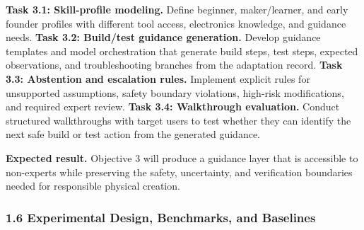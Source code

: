 \textbf{Task 3.1: Skill-profile modeling.} Define beginner, maker/learner, and early founder profiles with different tool access, electronics knowledge, and guidance needs.
\textbf{Task 3.2: Build/test guidance generation.} Develop guidance templates and model orchestration that generate build steps, test steps, expected observations, and troubleshooting branches from the adaptation record.
\textbf{Task 3.3: Abstention and escalation rules.} Implement explicit rules for unsupported assumptions, safety boundary violations, high-risk modifications, and required expert review.
\textbf{Task 3.4: Walkthrough evaluation.} Conduct structured walkthroughs with target users to test whether they can identify the next safe build or test action from the generated guidance.

\textbf{Expected result.} Objective 3 will produce a guidance layer that is accessible to non-experts while preserving the safety, uncertainty, and verification boundaries needed for responsible physical creation.


\subsubsection*{1.6 Experimental Design, Benchmarks, and Baselines}


